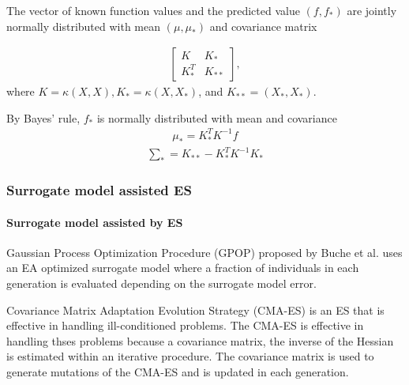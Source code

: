 The vector of known function values and the predicted value $(f,f_*)$ are jointly normally distributed with mean $(\mu,\mu_*)$ and covariance matrix

\begin{align}
\begin{bmatrix}
K & K_*\\
K_*^T&K_{**}
\end{bmatrix},
\end{align}
where $K = \kappa(X,X),K_* = \kappa (X,X_*)$, and $K_{**} = (X_*,X_*)$. 

By Bayes' rule, $f_*$ is normally distributed with mean and covariance 
\begin{align}\label{eqn:GP_mean}{}
\mu_* = K_*^T K^{-1}f
\end{align}
\begin{align}\label{eqn:GP_cov}{}
\sum_* = K_{**}- K_*^TK^{-1}K_*
\end{align}








\subsubsection{Surrogate model assisted ES}\label{sssec:surrogate_assisted_ES}\hfill



\paragraph{Surrogate model assisted by ES}
Gaussian Process Optimization Procedure (GPOP) proposed by Buche et al. \cite{1424193} uses an EA optimized surrogate model where a fraction of individuals in each generation is evaluated depending on the surrogate model error. 

Covariance Matrix Adaptation Evolution Strategy (CMA-ES) \cite{hansen2016cma} is an ES that is effective in handling ill-conditioned problems. The CMA-ES is effective in handling thses problems because a covariance matrix, the inverse of the Hessian is estimated within an iterative procedure. The covariance matrix is used to generate mutations of the CMA-ES and is updated in each generation.

